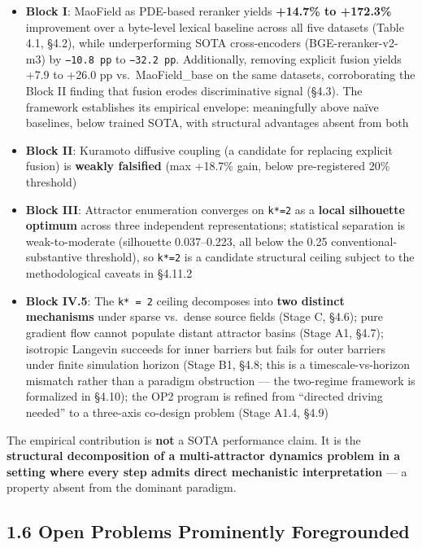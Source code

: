 \documentclass[
]{article}
\providecommand{\tightlist}{%
  \setlength{\itemsep}{0pt}\setlength{\parskip}{0pt}}
\begin{document}
\begin{itemize}
\tightlist
\item
  \textbf{Block I}: MaoField as PDE-based reranker yields
  \textbf{+14.7\% to +172.3\%} improvement over a byte-level lexical
  baseline across all five datasets (Table 4.1, §4.2), while
  underperforming SOTA cross-encoders (BGE-reranker-v2-m3) by
  \texttt{−10.8\ pp} to \texttt{−32.2\ pp}. Additionally, removing
  explicit fusion yields +7.9 to +26.0 pp vs.~MaoField\_base on the same
  datasets, corroborating the Block II finding that fusion erodes
  discriminative signal (§4.3). The framework establishes its empirical
  envelope: meaningfully above naïve baselines, below trained SOTA, with
  structural advantages absent from both
\item
  \textbf{Block II}: Kuramoto diffusive coupling (a candidate for
  replacing explicit fusion) is \textbf{weakly falsified} (max +18.7\%
  gain, below pre-registered 20\% threshold)
\item
  \textbf{Block III}: Attractor enumeration converges on \texttt{k*=2}
  as a \textbf{local silhouette optimum} across three independent
  representations; statistical separation is weak-to-moderate
  (silhouette 0.037--0.223, all below the 0.25 conventional-substantive
  threshold), so \texttt{k*=2} is a candidate structural ceiling subject
  to the methodological caveats in §4.11.2
\item
  \textbf{Block IV.5}: The \texttt{k*\ =\ 2} ceiling decomposes into
  \textbf{two distinct mechanisms} under sparse vs.~dense source fields
  (Stage C, §4.6); pure gradient flow cannot populate distant attractor
  basins (Stage A1, §4.7); isotropic Langevin succeeds for inner
  barriers but fails for outer barriers under finite simulation horizon
  (Stage B1, §4.8; this is a timescale-vs-horizon mismatch rather than a
  paradigm obstruction --- the two-regime framework is formalized in
  §4.10); the OP2 program is refined from ``directed driving needed'' to
  a three-axis co-design problem (Stage A1.4, §4.9)
\end{itemize}

The empirical contribution is \textbf{not} a SOTA performance claim. It
is the \textbf{structural decomposition of a multi-attractor dynamics
problem in a setting where every step admits direct mechanistic
interpretation} --- a property absent from the dominant paradigm.

\hypertarget{open-problems-prominently-foregrounded}{%
\subsection{1.6 Open Problems Prominently
Foregrounded}\label{open-problems-prominently-foregrounded}}
\end{document}
